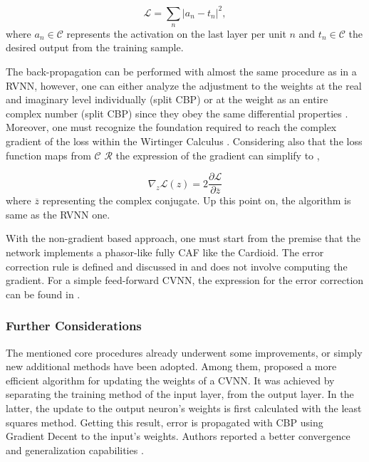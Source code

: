 \begin{equation}
	\mathcal{L} = \sum_n \left| a_n - t_n  \right| ^2,
\end{equation}
where $a_n \in \mathcal{C}$ represents the activation on the last layer per unit $n$ and $t_n \in \mathcal{C}$ the desired output from the training sample.

The back-propagation can be performed with almost the same procedure as in a \gls{RVNN}, however, one can either analyze the adjustment to the weights at the real and imaginary level individually (split \gls{CBP}) or at the weight as an entire complex number (split \gls{CBP}) since they obey the same differential properties \parencite{li2006backpropold, hirose2012complex, bassey2021survey, abdalla2023newtheory}. Moreover, one must recognize the foundation required to reach the complex gradient of the loss within the Wirtinger Calculus \parencite{wirtinger1927formalen}. Considering also that the loss function maps from $\mathcal{C}$ $\mathcal{R}$ the expression of the gradient can simplify to \parencite{bassey2021survey, abdalla2023newtheory},

\begin{equation}
		\nabla_z \mathcal{L}(z) = 2\dfrac{\partial \mathcal{L}}{\partial \overline{z}}
\end{equation}
where $\overline{z}$ representing the complex conjugate. Up this point on, the algorithm is same as the \gls{RVNN} one.

With the non-gradient based approach, one must start from the premise that the network implements a phasor-like fully \gls{CAF} like the Cardioid. The error correction rule is defined and discussed in \parencite{aizenberg1973multivalued} and does not involve computing the gradient. For a simple feed-forward \gls{CVNN}, the expression for the error correction can be found in \parencite{abdalla2023newtheory}.


\subsubsection{Further Considerations}

The mentioned core procedures already underwent some improvements, or simply new additional  methods have been adopted. Among them, \textcite{liu2017efficientweightupdate} proposed a more efficient algorithm for updating the weights of a \gls{CVNN}. It was achieved by separating the training method of the input layer, from the output layer. In the latter, the update to the output neuron's weights is first calculated with the least squares method. Getting this result, error is propagated with \gls{CBP} using Gradient Decent to  the input's weights. Authors reported a better convergence and generalization capabilities \parencite{liu2017efficientweightupdate}.  


